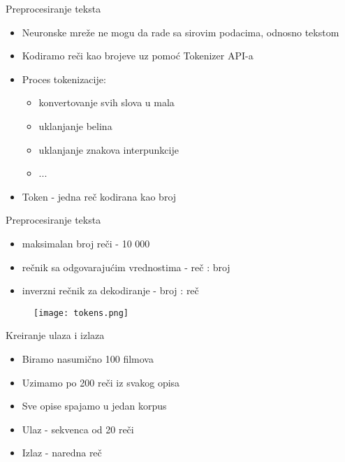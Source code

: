 \documentclass[table]{beamer}
\begin{document}
\begin{frame}{Preprocesiranje teksta}
\begin{itemize}
    \item Neuronske mreže ne mogu da rade sa sirovim podacima, odnosno tekstom
    \item Kodiramo reči kao brojeve uz pomoć Tokenizer API-a
    \item Proces tokenizacije: 
    \begin{itemize}
        \item konvertovanje svih slova u mala
        \item uklanjanje belina
        \item uklanjanje znakova interpunkcije
        \item ...
    \end{itemize}
    \item \alert{Token} - jedna reč kodirana kao broj
\end{itemize}
\end{frame}

\begin{frame}{Preprocesiranje teksta}
\begin{itemize}
    \item maksimalan broj reči - 10 000
    \item rečnik sa odgovarajućim vrednostima - {\color{orange}reč} : {\color{blue}broj}
    \item inverzni rečnik za dekodiranje - {\color{orange}broj} : {\color{blue}reč}
\end{itemize}
\begin{figure}
    \centering
    \texttt{[image: tokens.png]}
\end{figure}

\end{frame}

\begin{frame}{Kreiranje ulaza i izlaza}
\begin{itemize}
    \item Biramo nasumično {\color{blue}100} filmova
    \item Uzimamo po {\color{blue}200} reči iz svakog opisa
    \item Sve opise spajamo u jedan \alert{korpus}
    \item Ulaz - sekvenca od {\color{blue} 20} reči
    \item Izlaz - naredna reč
\end{itemize}
    
\end{frame}
\end{document}
